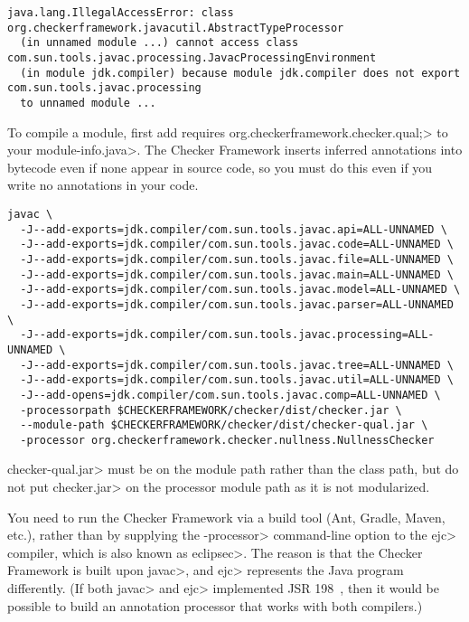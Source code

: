 \begin{Verbatim}
java.lang.IllegalAccessError: class org.checkerframework.javacutil.AbstractTypeProcessor
  (in unnamed module ...) cannot access class com.sun.tools.javac.processing.JavacProcessingEnvironment
  (in module jdk.compiler) because module jdk.compiler does not export com.sun.tools.javac.processing
  to unnamed module ...
\end{Verbatim}



To compile a module, first add \<requires
org.checkerframework.checker.qual;> to your \<module-info.java>.  The Checker
Framework inserts inferred annotations into bytecode even if none appear in source code,
so you must do this even if you write no annotations in your code.

\begin{Verbatim}
javac \
  -J--add-exports=jdk.compiler/com.sun.tools.javac.api=ALL-UNNAMED \
  -J--add-exports=jdk.compiler/com.sun.tools.javac.code=ALL-UNNAMED \
  -J--add-exports=jdk.compiler/com.sun.tools.javac.file=ALL-UNNAMED \
  -J--add-exports=jdk.compiler/com.sun.tools.javac.main=ALL-UNNAMED \
  -J--add-exports=jdk.compiler/com.sun.tools.javac.model=ALL-UNNAMED \
  -J--add-exports=jdk.compiler/com.sun.tools.javac.parser=ALL-UNNAMED \
  -J--add-exports=jdk.compiler/com.sun.tools.javac.processing=ALL-UNNAMED \
  -J--add-exports=jdk.compiler/com.sun.tools.javac.tree=ALL-UNNAMED \
  -J--add-exports=jdk.compiler/com.sun.tools.javac.util=ALL-UNNAMED \
  -J--add-opens=jdk.compiler/com.sun.tools.javac.comp=ALL-UNNAMED \
  -processorpath $CHECKERFRAMEWORK/checker/dist/checker.jar \
  --module-path $CHECKERFRAMEWORK/checker/dist/checker-qual.jar \
  -processor org.checkerframework.checker.nullness.NullnessChecker
\end{Verbatim}

\<checker-qual.jar> must be on the module path rather than the class path, but
do not put \<checker.jar> on the processor module path as it is not
modularized.


\sectionAndLabel{Eclipse}{eclipse}


You
need to run the Checker Framework via a build tool (Ant, Gradle, Maven, etc.), rather
than by supplying the \<-processor> command-line option to the \<ejc>
compiler, which is also known as \<eclipsec>.
The reason is that the Checker Framework is built upon \<javac>,
and \<ejc> represents the Java program differently.  (If both \<javac> and \<ejc>
implemented JSR 198~\cite{JSR198}, then it would be possible to build
an annotation processor that works with both compilers.)


